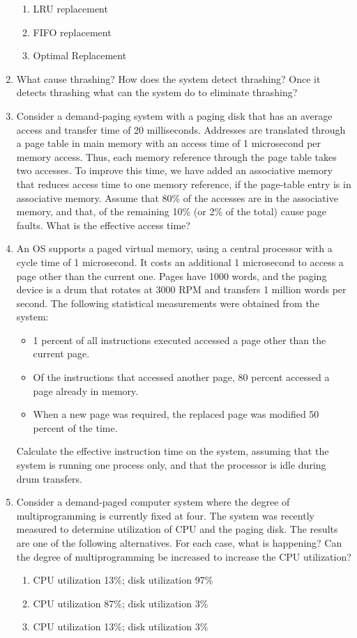 \documentclass{article}
\begin{document}
\begin{enumerate}
		\begin{enumerate}
			\item LRU replacement
			\item FIFO replacement
			\item Optimal Replacement
		\end{enumerate}
		\item What cause thrashing? How does the system detect thrashing? Once it detects thrashing what can the system do to eliminate thrashing?
		\item Consider a demand-paging system with a paging disk that has an average access and transfer time of 20 milliseconds. Addresses are translated through a page table in main memory with an access time of 1 microsecond per memory access. Thus, each memory reference through the page table takes two accesses. To improve this time, we have added an associative memory that reduces access time to one memory reference, if the page-table entry is in associative memory. Assume that 80\% of the accesses are in the associative memory, and that, of the remaining 10\% (or 2\% of the total) cause page faults. What is the effective access time?
		\item An OS supports a paged virtual memory, using a central processor with a cycle time of 1 microsecond. It costs an additional 1 microsecond to access a page other than the current one. Pages have 1000 words, and the paging device is a drum that rotates at 3000 RPM and transfers 1 million words per second. The following statistical measurements were obtained from the system:
		\begin{itemize}
			\item 1 percent of all instructions executed accessed a page other than the current page.
			\item Of the instructions that accessed another page, 80 percent accessed a page already in memory.
			\item When a new page was required, the replaced page was modified 50 percent of the time.
		\end{itemize}
		Calculate the effective instruction time on the system, assuming that the system is running one process only, and that the processor is idle during drum transfers.
		\item Consider a demand-paged computer system where the degree of multiprogramming is currently fixed at four. The system was recently measured to determine utilization of CPU and the paging disk. The results are one of the following alternatives. For each case, what is happening? Can the degree of multiprogramming be increased to increase the CPU utilization?
		\begin{enumerate}
			\item CPU utilization 13\%; disk utilization 97\%
			\item CPU utilization 87\%; disk utilization 3\%
			\item CPU utilization 13\%; disk utilization 3\%
		\end{enumerate}
	\end{enumerate}
\end{document}
